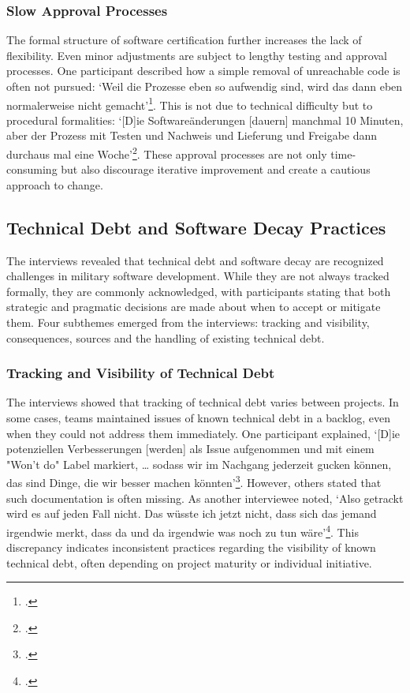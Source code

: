 \subsubsection{Slow Approval Processes}
The formal structure of software certification further increases the lack of flexibility. Even minor adjustments are subject to lengthy testing and approval processes. One participant described how a simple removal of unreachable code is often not pursued:
`Weil die Prozesse eben so aufwendig sind, wird das dann eben normalerweise nicht gemacht'\footcite[74]{Interview22025}. This is not due to technical difficulty but to procedural formalities: `[D]ie Softwareänderungen [dauern] manchmal 10 Minuten, aber der Prozess mit Testen und Nachweis und Lieferung und Freigabe dann durchaus mal eine Woche'\footcite[66]{Interview12025}.
These approval processes are not only time-consuming but also discourage iterative improvement and create a cautious approach to change.

\subsection{Technical Debt and Software Decay Practices}
The interviews revealed that technical debt and software decay are recognized challenges in military software development. While they are not always tracked formally, they are commonly acknowledged, with participants stating that both strategic and pragmatic decisions are made about when to accept or mitigate them.
Four subthemes emerged from the interviews: tracking and visibility, consequences, sources and the handling of existing technical debt.

\subsubsection{Tracking and Visibility of Technical Debt}
The interviews showed that tracking of technical debt varies between projects. In some cases, teams maintained issues of known technical debt in a backlog, even when they could not address them immediately. One participant explained, `[D]ie potenziellen Verbesserungen [werden] als Issue aufgenommen und mit einem "Won't do" Label markiert, \ldots
sodass wir im Nachgang jederzeit gucken können, das sind Dinge, die wir besser machen könnten'\footcite[78]{Interview32025}.
However, others stated that such documentation is often missing. As another interviewee noted, `Also getrackt wird es auf jeden Fall nicht. Das wüsste ich jetzt nicht, dass sich das jemand irgendwie merkt, dass da und da irgendwie was noch zu tun wäre'\footcite[62]{Interview12025}.
This discrepancy indicates inconsistent practices regarding the visibility of known technical debt, often depending on project maturity or individual initiative.\\

